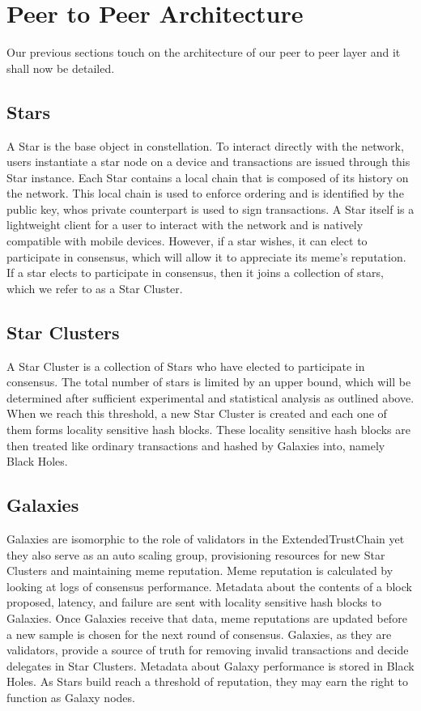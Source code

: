 \documentclass{article}
\begin{document}
\section{Peer to Peer Architecture}
Our previous sections touch on the architecture of our peer to peer layer and it shall now be detailed. 

\subsection{Stars}
A Star is the base object in constellation. To interact directly with the network, users instantiate a star node on a device and transactions are issued through this Star instance. Each Star contains a local chain that is composed of its history on the network. This local chain is used to enforce ordering and is identified by the public key, whos private counterpart is used to sign transactions. A Star itself is a lightweight client for a user to interact with the network and is natively compatible with mobile devices. However, if a star wishes, it can elect to participate in consensus, which will allow it to appreciate its meme's reputation. If a star elects to participate in consensus, then it joins a collection of stars, which we refer to as a Star Cluster.

\subsection{Star Clusters}
A Star Cluster is a collection of Stars who have elected to participate in consensus. The total number of stars is limited by an upper bound, which will be determined after sufficient experimental and statistical analysis as outlined above. When we reach this threshold, a new Star Cluster is created and each one of them forms locality sensitive hash blocks. These locality sensitive hash blocks are then treated like ordinary transactions and hashed by Galaxies into, namely Black Holes.

\subsection{Galaxies}
Galaxies are isomorphic to the role of validators in the ExtendedTrustChain yet they also serve as an auto scaling group, provisioning resources for new Star Clusters and maintaining meme reputation. Meme reputation is calculated by looking at logs of consensus performance. Metadata about the contents of a block proposed, latency, and failure are sent with locality sensitive hash blocks to Galaxies. Once Galaxies receive that data, meme reputations are updated before a new sample is chosen for the next round of consensus. Galaxies, as they are validators, provide a source of truth for removing invalid transactions and decide delegates in Star Clusters. Metadata about Galaxy performance is stored in Black Holes. As Stars build reach a threshold of reputation, they may earn the right to function as Galaxy nodes.
\end{document}
